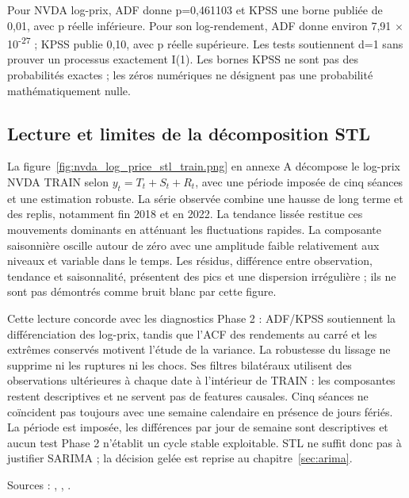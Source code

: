 



Pour NVDA log-prix, ADF donne p=0,461103 et KPSS une borne publiée de 0,01, avec p réelle inférieure. Pour son log-rendement, ADF donne environ 7,91 \(\times\) 10\textsuperscript{-27} ; KPSS publie 0,10, avec p réelle supérieure. Les tests soutiennent d=1 sans prouver un processus exactement I(1). Les bornes KPSS ne sont pas des probabilités exactes ; les zéros numériques ne désignent pas une probabilité mathématiquement nulle.



\subsection{Lecture et limites de la décomposition STL}

La figure~\ref{fig:nvda_log_price_stl_train.png} en annexe A décompose le log-prix NVDA TRAIN selon \(y_t=T_t+S_t+R_t\), avec une période imposée de cinq séances et une estimation robuste. La série observée combine une hausse de long terme et des replis, notamment fin 2018 et en 2022. La tendance lissée restitue ces mouvements dominants en atténuant les fluctuations rapides. La composante saisonnière oscille autour de zéro avec une amplitude faible relativement aux niveaux et variable dans le temps. Les résidus, différence entre observation, tendance et saisonnalité, présentent des pics et une dispersion irrégulière ; ils ne sont pas démontrés comme bruit blanc par cette figure.

Cette lecture concorde avec les diagnostics Phase 2 : ADF/KPSS soutiennent la différenciation des log-prix, tandis que l’ACF des rendements au carré et les extrêmes conservés motivent l’étude de la variance. La robustesse du lissage ne supprime ni les ruptures ni les chocs. Ses filtres bilatéraux utilisent des observations ultérieures à chaque date à l’intérieur de TRAIN : les composantes restent descriptives et ne servent pas de features causales. Cinq séances ne coïncident pas toujours avec une semaine calendaire en présence de jours fériés. La période est imposée, les différences par jour de semaine sont descriptives et aucun test Phase 2 n’établit un cycle stable exploitable. STL ne suffit donc pas à justifier SARIMA ; la décision gelée est reprise au chapitre~\ref{sec:arima}.



Sources : , , .
